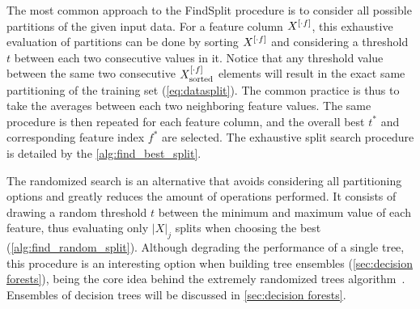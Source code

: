 The most common approach to the FindSplit procedure is to consider all possible partitions of the given input data.
%
For a feature column $X^{[\cdot f]}$, this exhaustive evaluation of partitions can be done by sorting $X^{[\cdot f]}$ and considering a threshold $t$ between each two consecutive values in it. Notice that any threshold value between the same two consecutive $X^{[\cdot f]}_\text{sorted}$ elements will result in the exact same partitioning of the training set (\autoref{eq:datasplit}). The common practice is thus to take the averages between each two neighboring feature values. The same procedure is then repeated for each feature column, and the overall best $t^\ast$ and corresponding feature index $f^\ast$ are selected.
%
%
The exhaustive split search procedure is detailed by the \autoref{alg:find_best_split}.

\algFindBestSplit

The randomized search is an alternative that avoids considering all partitioning options and greatly reduces the amount of operations performed.
It consists of drawing a random threshold $t$ between the minimum and maximum value of each feature, thus evaluating only $|X|_j$ splits when choosing the best (\autoref{alg:find_random_split}). Although degrading the performance of a single tree, this procedure is an interesting option when building tree ensembles (\autoref{sec:decision forests}), being the core idea behind the extremely randomized trees algorithm~\cite{geurts2006extremely}.  %
Ensembles of decision trees will be discussed in \autoref{sec:decision forests}.

\algFindRandomSplit


